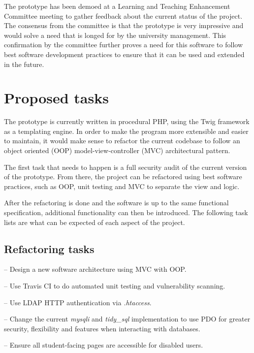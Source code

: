 \documentclass[11pt,fleqn,twoside]{article}
\begin{document}
The prototype has been demoed at a Learning and Teaching Enhancement Committee meeting to gather feedback about the current status of the project.
The consensus from the committee is that the prototype is very impressive and would solve a need that is longed for by the university management.
This confirmation by the committee further proves a need for this software to follow best software development practices to ensure that it can be used and extended in the future.

\section{Proposed tasks}

The prototype is currently written in procedural PHP, using the Twig\cite{Twig} framework as a templating engine.
In order to make the program more extensible and easier to maintain, it would make sense to refactor the current codebase to follow an object oriented (OOP) model-view-controller (MVC)\cite{PHPMVC2}\cite{PHPMVC} architectural pattern.

The first task that needs to happen is a full security audit of the current version of the prototype.
From there, the project can be refactored using best software practices, such as OOP, unit testing and MVC to separate the view and logic.

After the refactoring is done and the software is up to the same functional specification, additional functionality can then be introduced.
The following task lists are what can be expected of each aspect of the project.

\subsection{Refactoring tasks}
\begin{description}[itemindent=-2em,leftmargin=4em]
	\item[Change procedural design] -- Design a new software architecture using MVC with OOP.
	\item[Unit Testing] -- Use Travis CI\cite{TravisCI} to do automated unit testing and vulnerability scanning.
	\item[Secure admin dashboard] -- Use LDAP HTTP authentication via \emph{.htaccess}.
	\item[PHP Data Objects (PDO)] -- Change the current \emph{mysqli} and \emph{tidy\_sql} implementation to use PDO for greater security, flexibility and features when interacting with databases.
	\item[Accessibility (a11y) audit] -- Ensure all student-facing pages are accessible for disabled users.
\end{description}
\end{document}
